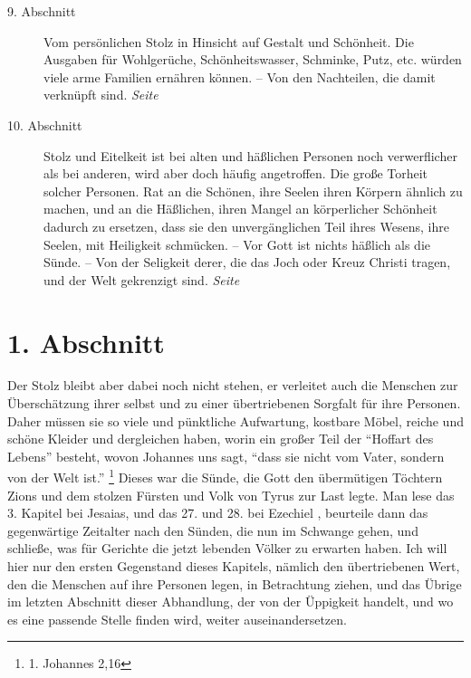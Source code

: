 \begin{description}
\item[9. Abschnitt] Vom persönlichen Stolz in Hinsicht auf Gestalt und
Schönheit. Die Ausgaben für Wohlgerüche, Schönheitswasser, Schminke, Putz, etc.
würden viele arme Familien ernähren können. -- Von den Nachteilen, die damit
verknüpft sind.
\dotfill \textit{Seite \pageref{kap11_ab9}}\\
\item[10. Abschnitt] Stolz und Eitelkeit ist bei alten und häßlichen Personen
noch verwerflicher als bei anderen, wird aber doch häufig angetroffen. Die große
Torheit solcher Personen. Rat an die Schönen, ihre Seelen ihren Körpern
ähnlich zu machen, und an die Häßlichen, ihren Mangel an körperlicher Schönheit
dadurch zu ersetzen, dass sie den unvergänglichen Teil ihres Wesens, ihre
Seelen, mit Heiligkeit schmücken. -- Vor Gott ist nichts häßlich als die Sünde.
-- Von der Seligkeit derer, die das Joch oder Kreuz Christi tragen, und der Welt
gekrenzigt sind.
\dotfill \textit{Seite \pageref{kap11_ab10}}\\

\end{description}

\newpage

\section{1. Abschnitt} \label{kap11_ab1}

Der Stolz bleibt aber dabei noch nicht stehen, er verleitet auch die Menschen
zur Überschätzung ihrer selbst und zu einer übertriebenen Sorgfalt für ihre
Personen. Daher müssen sie so viele und pünktliche Aufwartung, kostbare
Möbel,
reiche und schöne Kleider und dergleichen haben, worin ein großer Teil
der "`Hoffart
des Lebens"' besteht, wovon Johannes uns sagt,
"`dass sie nicht vom Vater,
sondern von der Welt ist."'
\footnote{1. Johannes 2,16}
Dieses war die Sünde, die Gott
den übermütigen Töchtern Zions und dem stolzen
Fürsten und Volk von Tyrus zur
Last legte. Man lese das 3. Kapitel bei Jesaias, und das 27. und 28. bei
Ezechiel ,
beurteile dann das gegenwärtige Zeitalter nach den Sünden, die nun im
Schwange gehen, und schließe, was für Gerichte die jetzt lebenden Völker zu
erwarten haben. Ich will hier nur den ersten Gegenstand dieses Kapitels, nämlich
den übertriebenen Wert, den die Menschen auf ihre Personen legen, in
Betrachtung ziehen, und das Übrige im letzten Abschnitt dieser Abhandlung, der
von der Üppigkeit handelt, und wo es eine passende Stelle finden wird,
weiter auseinandersetzen.

